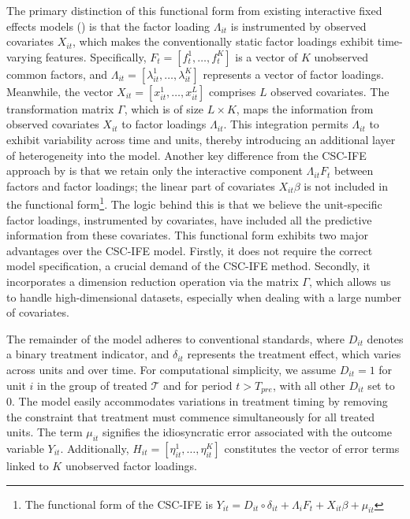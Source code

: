\documentclass[12pt]{article}
\begin{document}
The primary distinction of this functional form from existing interactive fixed effects models (\cite{gobillon2016regional, chan2016policy}) is that the factor loading $\Lambda_{it}$ is instrumented by observed covariates $X_{it}$, which makes the conventionally static factor loadings exhibit time-varying features. Specifically, $F_t = [f_t^1, \ldots, f_t^K]$ is a vector of $K$ unobserved common factors, and $\Lambda_{it} = [\lambda_{it}^1, \ldots, \lambda_{it}^K]$ represents a vector of factor loadings. Meanwhile, the vector $X_{it} = [x_{it}^1, \ldots, x_{it}^L]$ comprises $L$ observed covariates. The transformation matrix $\Gamma$, which is of size $L \times K$, maps the information from observed covariates $X_{it}$ to factor loadings $\Lambda_{it}$. This integration permits $\Lambda_{it}$ to exhibit variability across time and units, thereby introducing an additional layer of heterogeneity into the model. Another key difference from the CSC-IFE approach by \cite{xu2017generalized} is that we retain only the interactive component $\Lambda_{it} F_t$ between factors and factor loadings; the linear part of covariates $X_{it}\beta$ is not included in the functional form\footnote{The functional form of the CSC-IFE is $Y_{it} = D_{it} \circ \delta_{it} + \Lambda_{i}F_{t} + X_{it}\beta + \mu_{it}$}. The logic behind this is that we believe the unit-specific factor loadings, instrumented by covariates, have included all the predictive information from these covariates. This functional form exhibits two major advantages over the CSC-IFE model. Firstly, it does not require the correct model specification, a crucial demand of the CSC-IFE method. Secondly, it incorporates a dimension reduction operation via the matrix $\Gamma$, which allows us to handle high-dimensional datasets, especially when dealing with a large number of covariates.

The remainder of the model adheres to conventional standards, where $D_{it}$ denotes a binary treatment indicator, and $\delta_{it}$ represents the treatment effect, which varies across units and over time. For computational simplicity, we assume $D_{it} = 1$ for unit $i$ in the group of treated $\mathcal{T}$ and for period $t > T_{pre}$, with all other $D_{it}$ set to $0$. The model easily accommodates variations in treatment timing by removing the constraint that treatment must commence simultaneously for all treated units. The term $\mu_{it}$ signifies the idiosyncratic error associated with the outcome variable $Y_{it}$. Additionally, $H_{it} = [\eta_{it}^1, \ldots, \eta_{it}^K]$ constitutes the vector of error terms linked to $K$ unobserved factor loadings.
\end{document}
